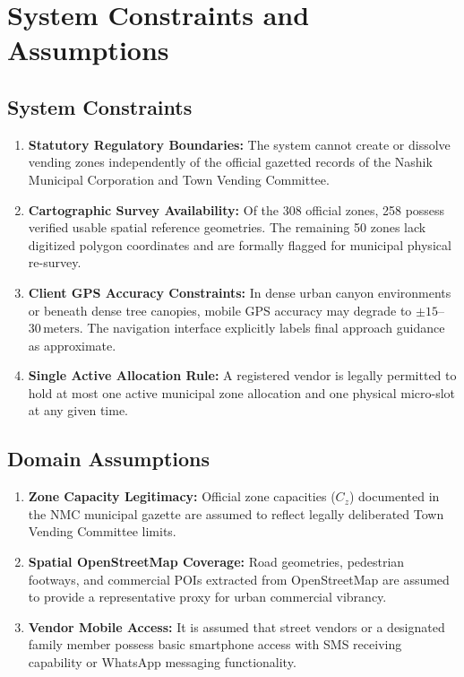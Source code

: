 \section{System Constraints and Assumptions}
\label{sec:constraints_assumptions}

\subsection{System Constraints}
\begin{enumerate}
    \item \textbf{Statutory Regulatory Boundaries:} The system cannot create or dissolve vending zones independently of the official gazetted records of the Nashik Municipal Corporation and Town Vending Committee.
    \item \textbf{Cartographic Survey Availability:} Of the 308 official zones, 258 possess verified usable spatial reference geometries. The remaining 50 zones lack digitized polygon coordinates and are formally flagged for municipal physical re-survey.
    \item \textbf{Client GPS Accuracy Constraints:} In dense urban canyon environments or beneath dense tree canopies, mobile GPS accuracy may degrade to $\pm 15$--$30\,\text{meters}$. The navigation interface explicitly labels final approach guidance as approximate.
    \item \textbf{Single Active Allocation Rule:} A registered vendor is legally permitted to hold at most one active municipal zone allocation and one physical micro-slot at any given time.
\end{enumerate}

\subsection{Domain Assumptions}
\begin{enumerate}
    \item \textbf{Zone Capacity Legitimacy:} Official zone capacities ($C_z$) documented in the NMC municipal gazette are assumed to reflect legally deliberated Town Vending Committee limits.
    \item \textbf{Spatial OpenStreetMap Coverage:} Road geometries, pedestrian footways, and commercial POIs extracted from OpenStreetMap are assumed to provide a representative proxy for urban commercial vibrancy.
    \item \textbf{Vendor Mobile Access:} It is assumed that street vendors or a designated family member possess basic smartphone access with SMS receiving capability or WhatsApp messaging functionality.
\end{enumerate}
